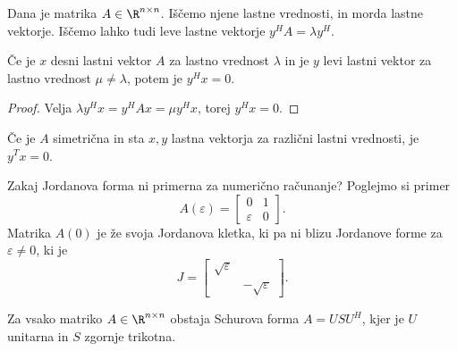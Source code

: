 
Dana je matrika $A \in \R^{n \times n}$.
Iščemo njene lastne vrednosti, in morda lastne vektorje.
Iščemo lahko tudi leve lastne vektorje $y^H A = \lambda y^H$.

\begin{lema}
  Če je $x$ desni lastni vektor $A$ za lastno vrednost $\lambda$ in je $y$ levi
  lastni vektor za lastno vrednost $\mu \ne \lambda$, potem je $y^H x = 0$.
\end{lema}

\begin{proof}
  Velja $\lambda y^H x = y^H Ax = \mu y^H x$, torej $y^H x = 0$.
\end{proof}

\begin{posledica}
  Če je $A$ simetrična in sta $x, y$ lastna vektorja za različni lastni
  vrednosti, je $y^T x = 0$.
\end{posledica}


\begin{vo}{Zakaj Jordanova forma ni primerna za numerično računanje?}
  Poglejmo si primer
  \[
	A(\varepsilon) =
	\begin{bmatrix}
	  0 & 1 \\ \varepsilon & 0
	\end{bmatrix}.
  \]
  Matrika $A(0)$ je že svoja Jordanova kletka, ki pa ni blizu Jordanove forme za
  $\varepsilon \ne 0$, ki je
  \[
	J =
	\begin{bmatrix}
	  \sqrt{\varepsilon} &  \\ & -\sqrt{\varepsilon}
	\end{bmatrix}.
  \]
\end{vo}

\begin{izrek}
  Za vsako matriko $A \in \R^{n \times n}$ obstaja Schurova forma $A = USU^H$,
  kjer je $U$ unitarna in $S$ zgornje trikotna.
\end{izrek}

